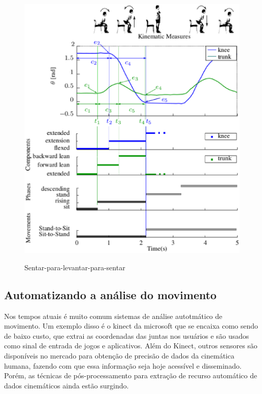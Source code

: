 \begin{figure}[!h]                                                               
\centering                                                                         
\includegraphics [keepaspectratio=true,scale=0.60]{figuras/sentaLevanta.eps}
\caption{Sentar-para-levantar-para-sentar}                                        
\cite{roberto}
\label{sentar-para-levantar-para-sentar}                                                        
\end{figure}                                                                    

\subsection{Automatizando a análise do movimento}
  Nos tempos atuais é muito comum sistemas de análise autotmático de movimento.
Um exemplo disso é o kinect da microsoft que se encaixa como sendo de baixo custo, que  
extrai as coordenadas das juntas nos usuários e são usados como sinal de entrada de jogos e aplicativos.
Além do Kinect, outros sensores são disponíveis no mercado para obtenção de precisão de dados da cinemática humana, fazendo com que essa informação seja hoje acessível e disseminado.
Porém, as técnicas de pós-processamento para extração de recurso automático de dados cinemáticos ainda estão surgindo.


